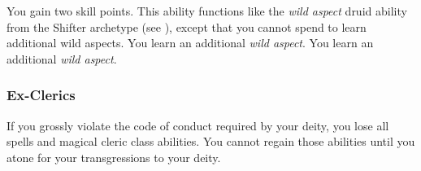              You gain two skill points.
             This ability functions like the \textit{wild aspect} druid ability from the Shifter archetype (see ), except that you cannot spend  to learn additional wild aspects.
             You learn an additional \textit{wild aspect}.
             You learn an additional \textit{wild aspect}.

        \subsubsection{Ex-Clerics}
            If you grossly violate the code of conduct required by your deity, you lose all spells and magical cleric class abilities.
            You cannot regain those abilities until you atone for your transgressions to your deity.

\newpage
